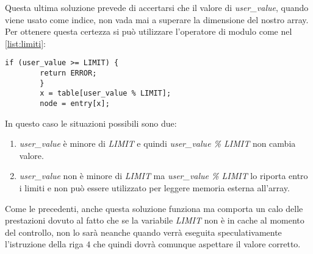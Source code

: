 		Questa ultima soluzione prevede di accertarsi che il valore di \emph{user\_value}, quando viene usato come indice, non vada mai a superare la dimensione del nostro array. Per ottenere questa certezza si può utilizzare l'operatore di modulo come nel \cref{list:limiti}:
		
		\begin{lstlisting}[caption={Rispetto dei limiti forzato},label={list:limiti}]
		if (user_value >= LIMIT) {
		return ERROR;
		}
		x = table[user_value % LIMIT]; 
		node = entry[x];
		\end{lstlisting}
		
		In questo caso le situazioni possibili sono due:
		
		\begin{enumerate}
			\item \emph{user\_value} è minore di \emph{LIMIT} e quindi \emph{user\_value \% LIMIT} non cambia valore.
			\item \emph{user\_value} non è minore di \emph{LIMIT} ma \emph{user\_value \% LIMIT} lo riporta entro i limiti e non può essere utilizzato per leggere memoria esterna all'array.
		\end{enumerate}
	
		Come le precedenti, anche questa soluzione funziona ma comporta un calo delle prestazioni dovuto al fatto che se la variabile \emph{LIMIT} non è in cache al momento del controllo, non lo sarà neanche quando verrà eseguita speculativamente l'istruzione della riga $4$ che quindi dovrà comunque aspettare il valore corretto. 
